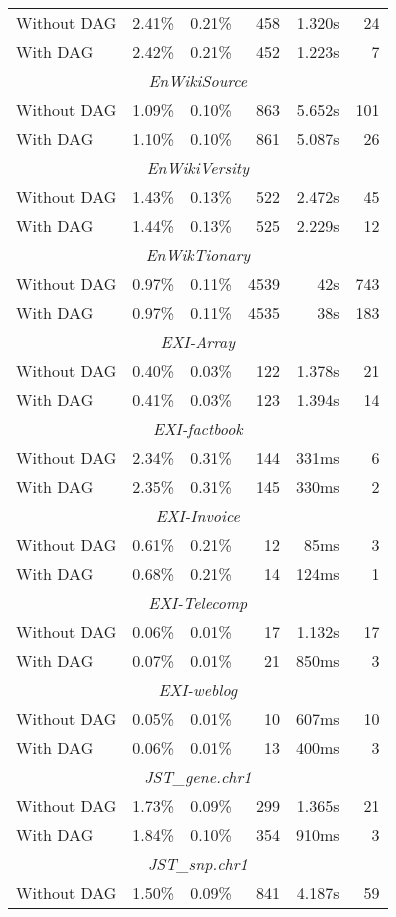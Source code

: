 \documentclass[12pt]{llncs}
\begin{document}
\begin{longtable}{lrrrrr}
			Without DAG&2.41\%&0.21\%&458&1.320s&24\\*
			With DAG&2.42\%&0.21\%&452&1.223s&7\\
			\midrule\multicolumn{6}{c}{\emph{EnWikiSource}}\\*
			Without DAG&1.09\%&0.10\%&863&5.652s&101\\*
			With DAG&1.10\%&0.10\%&861&5.087s&26\\
			\midrule\multicolumn{6}{c}{\emph{EnWikiVersity}}\\*
			Without DAG&1.43\%&0.13\%&522&2.472s&45\\*
			With DAG&1.44\%&0.13\%&525&2.229s&12\\
			\midrule\multicolumn{6}{c}{\emph{EnWikTionary}}\\*
			Without DAG&0.97\%&0.11\%&4539&42s&743\\*
			With DAG&0.97\%&0.11\%&4535&38s&183\\
			\midrule\multicolumn{6}{c}{\emph{EXI-Array}}\\*
			Without DAG&0.40\%&0.03\%&122&1.378s&21\\*
			With DAG&0.41\%&0.03\%&123&1.394s&14\\
			\midrule\multicolumn{6}{c}{\emph{EXI-factbook}}\\*
			Without DAG&2.34\%&0.31\%&144&331ms&6\\*
			With DAG&2.35\%&0.31\%&145&330ms&2\\
			\midrule\multicolumn{6}{c}{\emph{EXI-Invoice}}\\*
			Without DAG&0.61\%&0.21\%&12&85ms&3\\*
			With DAG&0.68\%&0.21\%&14&124ms&1\\
			\midrule\multicolumn{6}{c}{\emph{EXI-Telecomp}}\\*
			Without DAG&0.06\%&0.01\%&17&1.132s&17\\*
			With DAG&0.07\%&0.01\%&21&850ms&3\\
			\midrule\multicolumn{6}{c}{\emph{EXI-weblog}}\\*
			Without DAG&0.05\%&0.01\%&10&607ms&10\\*
			With DAG&0.06\%&0.01\%&13&400ms&3\\
			\midrule\multicolumn{6}{c}{\emph{JST\_gene.chr1}}\\*
			Without DAG&1.73\%&0.09\%&299&1.365s&21\\*
			With DAG&1.84\%&0.10\%&354&910ms&3\\
			\midrule\multicolumn{6}{c}{\emph{JST\_snp.chr1}}\\*
			Without DAG&1.50\%&0.09\%&841&4.187s&59\\*

\end{longtable}
\end{document}
